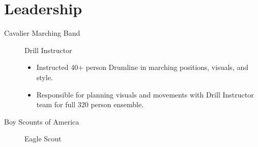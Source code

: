 \documentclass{mycv}
\begin{document}
\section{Leadership}
\vspace{-\parskip}%
\begin{description}
  \item[Cavalier Marching Band] Drill Instructor
  \begin{itemize}
    \item Instructed 40+ person Drumline in marching positions, visuals, and style.
    \item Responsible for planning visuals and movements with Drill Instructor team for full 320 person ensemble.
  \end{itemize}
  \item[Boy Scounts of America] Eagle Scout
\end{description}
\end{document}
